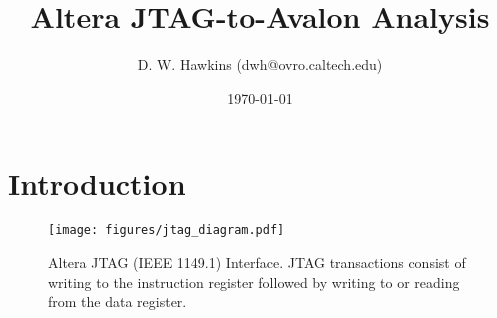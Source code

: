 \documentclass[10pt,twoside]{article}
\begin{document}
\title{Altera JTAG-to-Avalon Analysis}
\author{D. W. Hawkins (dwh@ovro.caltech.edu)}
\date{\today}
\maketitle

\thispagestyle{empty}

\tableofcontents

\cleardoublepage

\pagestyle{fancy}
\chead{}
\rhead{\today}
\lfoot{}
\cfoot{}
\rfoot{\thepage}
\renewcommand{\headrulewidth}{0.4pt}
\renewcommand{\footrulewidth}{0.4pt}

\lstset{language=Tcl}

\section{Introduction}

%
\begin{figure}
  \begin{center}
    \texttt{[image: figures/jtag\_diagram.pdf]}
  \end{center}
  \caption{Altera JTAG (IEEE 1149.1) Interface. JTAG transactions
  consist of writing to the instruction register followed by
  writing to or reading from the data register.}
  \label{fig:jtag_diagram}
\end{figure}
\end{document}
